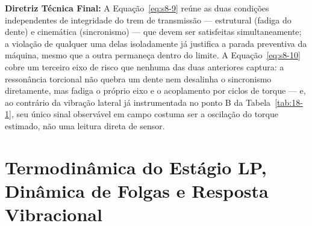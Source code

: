 \documentclass[12pt,a4paper]{article}
\numberwithin{equation}{section}
\numberwithin{table}{section}
\numberwithin{figure}{section}
\begin{document}
{	\textbf{Diretriz Técnica Final:} A Equação~\eqref{eq:s8-9} reúne as duas condições independentes de integridade do trem de transmissão — estrutural (fadiga do dente) e cinemática (sincronismo) — que devem ser satisfeitas simultaneamente; a violação de qualquer uma delas isoladamente já justifica a parada preventiva da máquina, mesmo que a outra permaneça dentro do limite. A Equação~\eqref{eq:s8-10} cobre um terceiro eixo de risco que nenhuma das duas anteriores captura: a ressonância torcional não quebra um dente nem desalinha o sincronismo diretamente, mas fadiga o próprio eixo e o acoplamento por ciclos de torque — e, ao contrário da vibração lateral já instrumentada no ponto B da Tabela~\ref{tab:18-1}, seu único sinal observável em campo costuma ser a oscilação do torque estimado, não uma leitura direta de sensor.

	
	
	\clearpage
	\section{\textbf{Termodinâmica do Estágio LP, Dinâmica de Folgas e Resposta Vibracional}}




}
\end{document}
